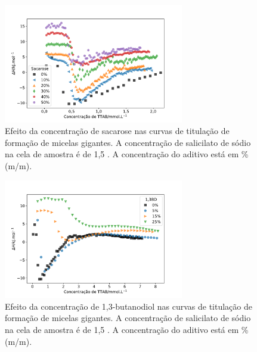			\begin{figure}[h]
				\centering
				\includegraphics[width=0.7\textwidth]{imagens/itc/ITC_MG_sac}
				\caption{Efeito da concentração de sacarose nas curvas de titulação de formação de micelas gigantes. A concentração de salicilato de sódio na cela de amostra é de 1,5 \mM. A concentração do aditivo está em \% (m/m).}
				\label{fig:itc_mg_sacarose}
			\end{figure} 
			
						
			\begin{figure}[h]
				\centering
				\includegraphics[width=0.7\textwidth]{imagens/itc/ITC_MG_13BD}
				\caption{Efeito da concentração de 1,3-butanodiol nas curvas de titulação de formação de micelas gigantes. A concentração de salicilato de sódio na cela de amostra é de 1,5 \mM. A concentração do aditivo está em \% (m/m).}
				\label{fig:itc_mg_13bd}
			\end{figure} 
			
